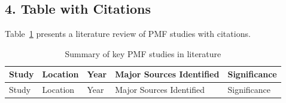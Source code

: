 \documentclass[
  letterpaper,
  oneside,
  openany]{MastersDoctoralThesis}
\begin{document}
\subsection{4. Table with Citations}\label{sec-app-b-citations}

Table~\ref{tbl-app-b-citations} presents a literature review of PMF
studies with citations.

\begin{longtable}[]{@{}
  >{\raggedright\arraybackslash}p{}
  >{\raggedright\arraybackslash}p{}
  >{\raggedright\arraybackslash}p{}
  >{\raggedright\arraybackslash}p{}
  >{\raggedright\arraybackslash}p{}@{}}
\caption{Summary of key PMF studies in
literature}\label{tbl-app-b-citations}\tabularnewline
\toprule\noalign{}
\begin{minipage}[b]{\linewidth}\raggedright
Study
\end{minipage} & \begin{minipage}[b]{\linewidth}\raggedright
Location
\end{minipage} & \begin{minipage}[b]{\linewidth}\raggedright
Year
\end{minipage} & \begin{minipage}[b]{\linewidth}\raggedright
Major Sources Identified
\end{minipage} & \begin{minipage}[b]{\linewidth}\raggedright
Significance
\end{minipage} \\
\midrule\noalign{}
\endfirsthead
\toprule\noalign{}
\begin{minipage}[b]{\linewidth}\raggedright
Study
\end{minipage} & \begin{minipage}[b]{\linewidth}\raggedright
Location
\end{minipage} & \begin{minipage}[b]{\linewidth}\raggedright
Year
\end{minipage} & \begin{minipage}[b]{\linewidth}\raggedright
Major Sources Identified
\end{minipage} & \begin{minipage}[b]{\linewidth}\raggedright
Significance
\end{minipage} \\

\end{longtable}
\end{document}
